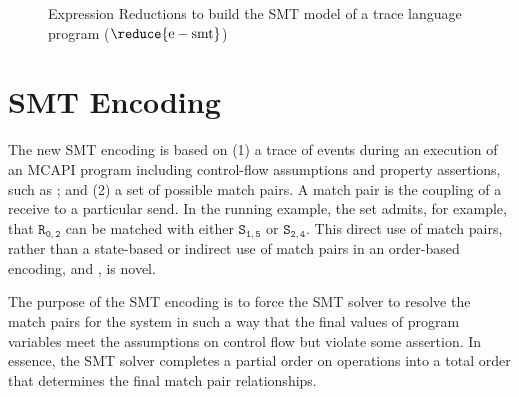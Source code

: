 \begin{figure}
{\begin{mathpar}
\end{mathpar}}
\caption{Expression Reductions to build the SMT model of a trace language program ($\reduce{\mathrm{e-smt}}$)}
\label{fig:expression_smt}
\end{figure}

\section{SMT Encoding}\label{sec:smt}

The new SMT encoding is based on (1) a trace of events during an
execution of an MCAPI program including control-flow assumptions and
property assertions, such as \figref{fig:trace1}; and (2) a set of
possible match pairs. A match pair is the coupling of a receive to a
particular send.  In the running example, the set admits, for example,
that $\mathtt{R_{0,2}}$ can be matched with either $\mathtt{S_{1,5}}$
or $\mathtt{S_{2,4}}$. This direct use of match pairs, rather than a
state-based or indirect use of match pairs in an order-based
encoding, \cite{elwakil:padtad10} and \cite{elwakil:atva10}, is novel.

The purpose of the SMT encoding is to force the SMT solver to resolve
the match pairs for the system in such a way that the final values of
program variables meet the assumptions on control flow but violate
some assertion. In essence, the SMT solver completes a partial order
on operations into a total order that determines the final match pair
relationships.

